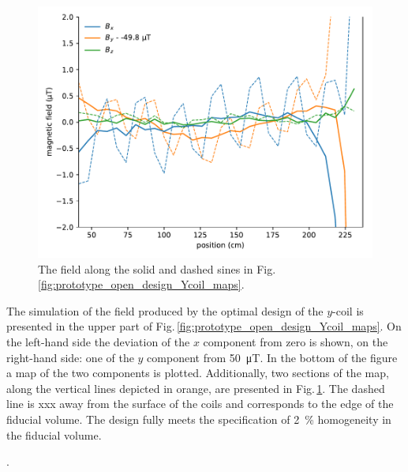 \begin{figure}
  \centering
  \includegraphics[width=0.9\linewidth]{gfx/prototype/open_planar_map_Y_By_section.pdf}
  \caption{The field along the solid and dashed sines in Fig.\,\ref{fig:prototype_open_design_Ycoil_maps}.}\label{fig:prototype_open_design_Ycoil_map_section}
\end{figure}

The simulation of the field produced by the optimal design of the $y$-coil is presented in the upper part of Fig.\,\ref{fig:prototype_open_design_Ycoil_maps}. On the left-hand side the deviation of the $x$ component from zero is shown, on the right-hand side: one of the $y$ component from \SI{50}{\micro\tesla}. In the bottom of the figure a map of the two components is plotted. Additionally, two sections of the map, along the vertical lines depicted in orange, are presented in Fig.\,\ref{fig:prototype_open_design_Ycoil_map_section}. The dashed line is xxx away from the surface of the coils and corresponds to the edge of the fiducial volume. The design fully meets the specification of \SI{2}{\percent} homogeneity in the fiducial volume.


.

